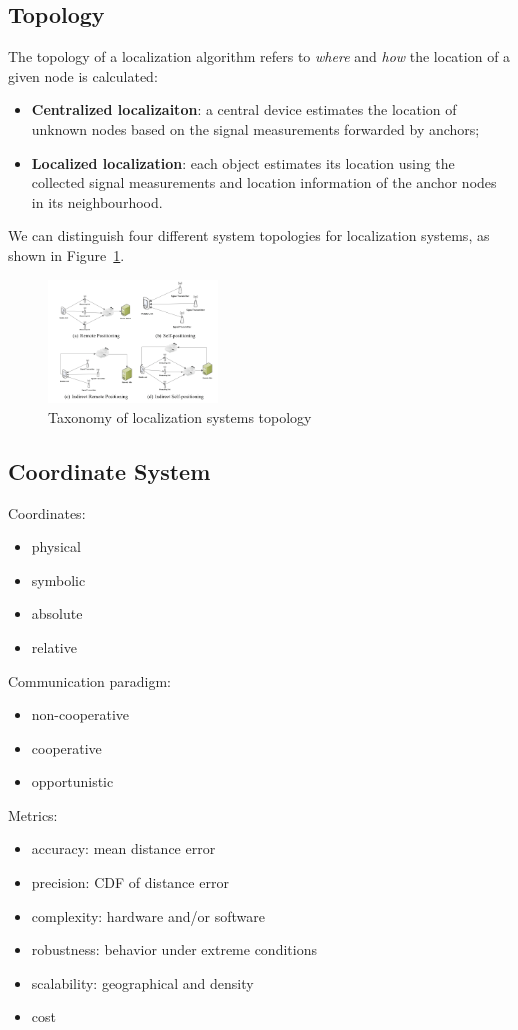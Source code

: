 \documentclass[a4paper,12pt]{article}
\begin{document}
\subsection{Topology}
The topology of a localization algorithm refers to \textit{where} and \textit{how} the location of a given node is calculated:

\begin{itemize}
	\item \textbf{Centralized localizaiton}: a central device estimates the location of unknown nodes based on the signal measurements forwarded by anchors;
	\item \textbf{Localized localization}: each object estimates its location using the collected signal measurements and location information of the anchor nodes in its neighbourhood.
\end{itemize}

We can distinguish four different system topologies for localization systems, as shown in Figure~\ref{fig:topology}.
\begin{figure}[H]
	\centering
  	\includegraphics[width=0.4\textwidth]{img/topology}
  	\caption{\label{fig:topology}Taxonomy of localization systems topology}
\end{figure}

\subsection{Coordinate System}
Coordinates:
\begin{itemize}
  \item physical
  \item symbolic
  \item absolute
  \item relative
\end{itemize}

Communication paradigm:
\begin{itemize}
  \item non-cooperative
  \item cooperative
  \item opportunistic
\end{itemize}

Metrics:
\begin{itemize}
  \item accuracy: mean distance error
  \item precision: CDF of distance error
  \item complexity: hardware and/or software
  \item robustness: behavior under extreme conditions
  \item scalability: geographical and density
  \item cost
\end{itemize}
\end{document}
